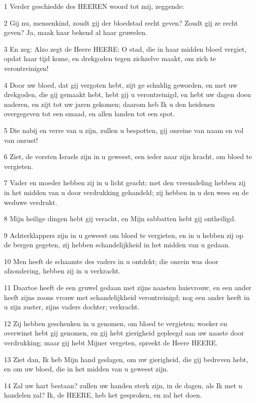 \par 1 Verder geschiedde des HEEREN woord tot mij, zeggende:
\par 2 Gij nu, mensenkind, zoudt gij der bloedstad recht geven? Zoudt gij ze recht geven? Ja, maak haar bekend al haar gruwelen.
\par 3 En zeg: Alzo zegt de Heere HEERE: O stad, die in haar midden bloed vergiet, opdat haar tijd kome, en drekgoden tegen zichzelve maakt, om zich te verontreinigen!
\par 4 Door uw bloed, dat gij vergoten hebt, zijt ge schuldig geworden, en met uw drekgoden, die gij gemaakt hebt, hebt gij u verontreinigd, en hebt uw dagen doen naderen, en zijt tot uw jaren gekomen; daarom heb Ik u den heidenen overgegeven tot een smaad, en allen landen tot een spot.
\par 5 Die nabij en verre van u zijn, zullen u bespotten, gij onreine van naam en vol van onrust!
\par 6 Ziet, de vorsten Israels zijn in u geweest, een ieder naar zijn kracht, om bloed te vergieten.
\par 7 Vader en moeder hebben zij in u licht geacht; met den vreemdeling hebben zij in het midden van u door verdrukking gehandeld; zij hebben in u den wees en de weduwe verdrukt.
\par 8 Mijn heilige dingen hebt gij veracht, en Mijn sabbatten hebt gij ontheiligd.
\par 9 Achterklappers zijn in u geweest om bloed te vergieten, en in u hebben zij op de bergen gegeten, zij hebben schandelijkheid in het midden van u gedaan.
\par 10 Men heeft de schaamte des vaders in u ontdekt; die onrein was door afzondering, hebben zij in u verkracht.
\par 11 Daartoe heeft de een gruwel gedaan met zijns naasten huisvrouw, en een ander heeft zijns zoons vrouw met schandelijkheid verontreinigd; nog een ander heeft in u zijn zuster, zijns vaders dochter; verkracht.
\par 12 Zij hebben geschenken in u genomen, om bloed te vergieten; woeker en overwinst hebt gij genomen, en gij hebt gierigheid gepleegd aan uw naaste door verdrukking; maar gij hebt Mijner vergeten, spreekt de Heere HEERE.
\par 13 Ziet dan, Ik heb Mijn hand geslagen, om uw gierigheid, die gij bedreven hebt, en om uw bloed, die in het midden van u geweest zijn.
\par 14 Zal uw hart bestaan? zullen uw handen sterk zijn, in de dagen, als Ik met u handelen zal? Ik, de HEERE, heb het gesproken, en zal het doen.
